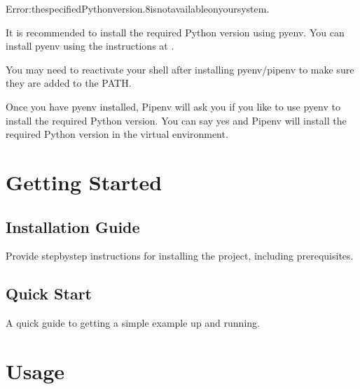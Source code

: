 \documentclass[letterpaper,10pt,english]{sphinxmanual}
\begin{document}
\begin{sphinxVerbatim}[commandchars=\\\{\}]
Error:thespecifiedPythonversion.8isnotavailableonyoursystem.
\end{sphinxVerbatim}

\sphinxAtStartPar
It is recommended to install the required Python version using pyenv. You can install pyenv using the instructions at .

\sphinxAtStartPar
You may need to reactivate your shell after installing pyenv/pipenv to make sure they are added to the PATH.

\sphinxAtStartPar
Once you have pyenv installed, Pipenv will ask you if you like to use pyenv to install the required Python version. You can say yes and Pipenv will install the required Python version in the virtual environment.

\sphinxstepscope


\chapter{Getting Started}
\label{\detokenize{getting_started:getting-started}}\label{\detokenize{getting_started::doc}}

\section{Installation Guide}
\label{\detokenize{getting_started:installation-guide}}
\sphinxAtStartPar
Provide step\sphinxhyphen{}by\sphinxhyphen{}step instructions for installing the project, including prerequisites.


\section{Quick Start}
\label{\detokenize{getting_started:quick-start}}
\sphinxAtStartPar
A quick guide to getting a simple example up and running.

\sphinxstepscope


\chapter{Usage}
\label{\detokenize{usage:usage}}\label{\detokenize{usage::doc}}
\end{document}
